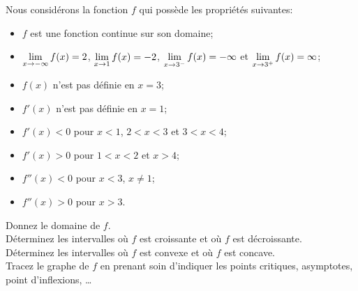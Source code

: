 \begin{question}
Nous considérons la fonction $f$ qui possède les propriétés suivantes:
{\renewcommand{\labelitemi}{\textbullet}
\begin{itemize}
\item $f$ est une fonction continue sur son domaine;
\item $\displaystyle \lim_{x\to -\infty}f(x)=2$,
$\displaystyle \lim_{x\to 1}f(x)=-2$,
$\displaystyle \lim_{x\to 3^-} f(x) = -\infty$ et
$\displaystyle \lim_{x\to 3^+}f(x)= \infty$;
\item $f(x)$ n'est pas définie en $x=3$;
\item $f'(x)$ n'est pas définie en $x=1$;
\item $f'(x)<0$ pour $x<1$, $2 < x < 3$ et $3 < x < 4$;
\item $f'(x)>0$ pour $1 < x < 2$ et $x > 4$;
\item $f''(x)<0$ pour $x<3$, $x\neq 1$;
\item $f''(x)>0$ pour $x>3$.
\end{itemize}
}
 Donnez le domaine de $f$.\\
 Déterminez les intervalles où $f$ est croissante et où $f$
est décroissante.\\
 Déterminez les intervalles où $f$ est convexe et
où $f$ est concave.\\
 Tracez le graphe de $f$ en prenant soin d'indiquer les points
critiques, asymptotes, point d'inflexions, \ldots
\label{6Q20}
\end{question}

